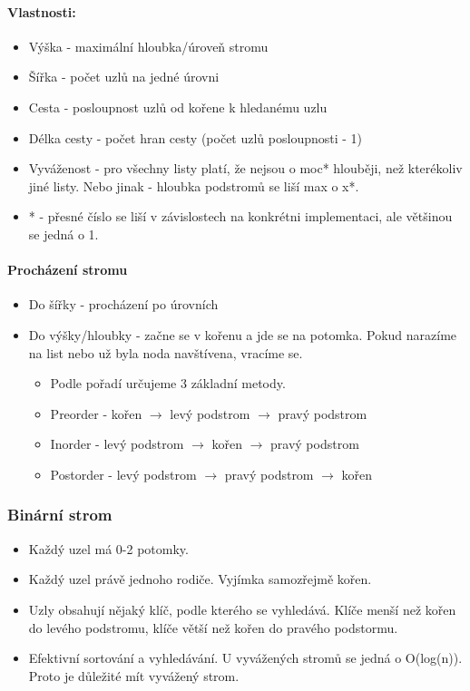 \documentclass[10pt,a4paper]{article}
\begin{document}
\paragraph{Vlastnosti:}
\begin{itemize}
\item Výška - maximální hloubka/úroveň stromu
\item Šířka - počet uzlů na jedné úrovni
\item Cesta - posloupnost uzlů od kořene k hledanému uzlu
\item Délka cesty - počet hran cesty (počet uzlů posloupnosti - 1)
\item Vyváženost - pro všechny listy platí, že nejsou o moc* hlouběji, než kterékoliv jiné listy. Nebo jinak - hloubka podstromů se liší max o x*.
\item * - přesné číslo se liší v závislostech na konkrétni implementaci, ale většinou se jedná o 1.
\end{itemize}

\paragraph{Procházení stromu}
\begin{itemize}
\item Do šířky - procházení po úrovních
\item Do výšky/hloubky - začne se v kořenu a jde se na potomka. Pokud narazíme na list nebo už byla noda navštívena, vracíme se.
\begin{itemize}
\item Podle pořadí určujeme 3 základní metody.
\item Preorder - kořen $\rightarrow$ levý podstrom $\rightarrow$ pravý podstrom
\item Inorder - levý podstrom $\rightarrow$ kořen $\rightarrow$ pravý podstrom
\item Postorder - levý podstrom $\rightarrow$ pravý podstrom $\rightarrow$ kořen
\end{itemize}
\end{itemize}

\subsubsection{Binární strom}
\begin{itemize}
\item Každý uzel má 0-2 potomky.
\item Každý uzel právě jednoho rodiče. Vyjímka samozřejmě kořen.
\item Uzly obsahují nějaký klíč, podle kterého se vyhledává. Klíče menší než kořen do levého podstromu, klíče větší než kořen do pravého podstormu.
\item Efektivní sortování a vyhledávání. U vyvážených stromů se jedná o O(log(n)). Proto je důležité mít vyvážený strom.
\end{itemize}
\end{document}
